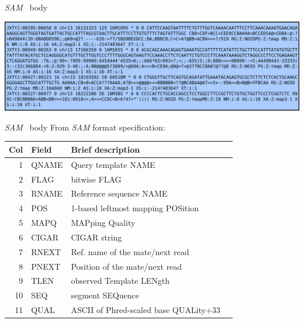 \documentclass{beamer}
\newcommand{\sam}{\textit{SAM}}
\begin{document}
\begin{frame}{\sam~ body}
  \begin{center}
    \includegraphics[width=\linewidth, keepaspectratio]{pic/sam_b.png}
  \end{center}
\end{frame}

\begin{frame}{\sam~ body}
  From \textit{SAM} format specification:
  \begin{tabular}{rlll}
    \hline
    {\bf Col} & {\bf Field} & {\bf Brief description} \\
    \hline
    1 & {\sf QNAME} & Query template NAME\\
    2 & {\sf FLAG} & bitwise FLAG \\
    3 & {\sf RNAME} & Reference sequence NAME\\
    4 & {\sf POS} & 1-based leftmost mapping POSition \\
    5 & {\sf MAPQ} & MAPping Quality \\
    6 & {\sf CIGAR} & CIGAR string \\
    7 & {\sf RNEXT} & Ref. name of the mate/next read\\
    8 & {\sf PNEXT} & Position of the mate/next read \\
    9 & {\sf TLEN} & observed Template LENgth \\
    10 & {\sf SEQ} & segment SEQuence\\
    11 & {\sf QUAL} & ASCII of Phred-scaled base QUALity+33 \\
    \hline
  \end{tabular}
\end{frame}
\end{document}
